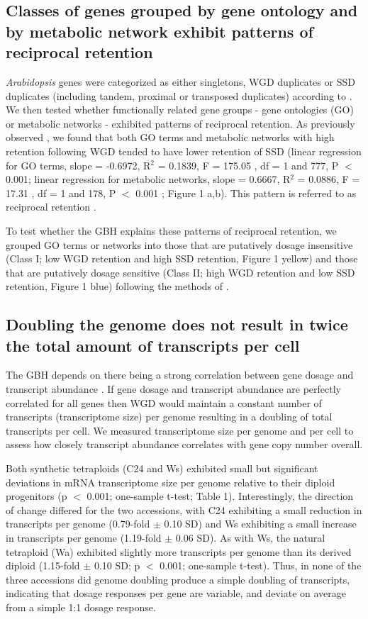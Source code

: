 \documentclass[11pt]{article}
\begin{document}
\subsection*{Classes of genes grouped by gene ontology and by metabolic network exhibit patterns of reciprocal retention}

{\it Arabidopsis} genes were categorized as either singletons, WGD duplicates or SSD duplicates (including tandem, proximal or transposed duplicates) according to \cite{wang2013}. We then tested whether functionally related gene groups - gene ontologies (GO) or metabolic networks \citep{schlapfer2017}- exhibited patterns of reciprocal retention. As previously observed \citep{freeling2009, coate2016, tasdighian2017}, we found that both GO terms and metabolic networks with high retention following WGD tended to have lower retention of SSD (linear regression for GO terms, slope = -0.6972, R$^2$ = 0.1839, F = 175.05 , df = 1 and 777, P $<$ 0.001;  linear  regression  for  metabolic  networks, slope = 0.6667, R$^2$ = 0.0886, F = 17.31 , df = 1 and 178, P $<$ 0.001 ; Figure 1 a,b). This pattern is referred to as reciprocal retention \citep{cannon2004, freeling2009}.

To test whether the GBH explains these patterns of reciprocal retention, we grouped GO terms or networks into those that are putatively dosage insensitive (Class I; low WGD retention and high SSD retention, Figure 1 yellow) and those that are putatively dosage sensitive (Class II; high WGD retention and low SSD retention, Figure 1 blue) following the methods of \cite{coate2016}. 

\subsection*{Doubling the genome does not result in twice the total amount of transcripts per cell}

The GBH depends on there being a strong correlation between gene dosage and transcript abundance \citep{coate2016}. If gene dosage and transcript abundance are perfectly correlated for all genes then WGD would maintain a constant number of transcripts (transcriptome size) per genome resulting in a doubling of total transcripts per cell. We measured transcriptome size per genome and per cell to assess how closely transcript abundance correlates with gene copy number overall. 

Both synthetic tetraploids (C24 and Ws) exhibited small but significant deviations in mRNA transcriptome size per genome relative to their diploid progenitors (p $<$ 0.001; one-sample t-test; Table 1). Interestingly, the direction of change differed for the two accessions, with C24 exhibiting a small reduction in transcripts per genome (0.79-fold $\pm$ 0.10 SD) and Ws exhibiting a small increase in transcripts per genome (1.19-fold $\pm$ 0.06 SD). As with Ws, the natural tetraploid (Wa) exhibited slightly more transcripts per genome than its derived diploid (1.15-fold $\pm$ 0.10 SD; p $<$ 0.001; one-sample t-test). Thus, in none of the three accessions did genome doubling produce a simple doubling of transcripts, indicating that dosage responses per gene are variable, and deviate on average from a simple 1:1 dosage response.
\end{document}
